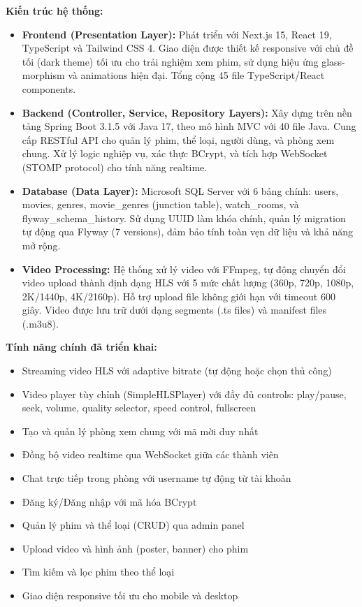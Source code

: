 \textbf{Kiến trúc hệ thống:}
\begin{itemize}
	\item \textbf{Frontend (Presentation Layer):} Phát triển với Next.js 15, React 19, TypeScript và Tailwind CSS 4. Giao diện được thiết kế responsive với chủ đề tối (dark theme) tối ưu cho trải nghiệm xem phim, sử dụng hiệu ứng glass-morphism và animations hiện đại. Tổng cộng 45 file TypeScript/React components.

	\item \textbf{Backend (Controller, Service, Repository Layers):} Xây dựng trên nền tảng Spring Boot 3.1.5 với Java 17, theo mô hình MVC với 40 file Java. Cung cấp RESTful API cho quản lý phim, thể loại, người dùng, và phòng xem chung. Xử lý logic nghiệp vụ, xác thực BCrypt, và tích hợp WebSocket (STOMP protocol) cho tính năng realtime.

	\item \textbf{Database (Data Layer):} Microsoft SQL Server với 6 bảng chính: users, movies, genres, movie\_genres (junction table), watch\_rooms, và flyway\_schema\_history. Sử dụng UUID làm khóa chính, quản lý migration tự động qua Flyway (7 versions), đảm bảo tính toàn vẹn dữ liệu và khả năng mở rộng.

	\item \textbf{Video Processing:} Hệ thống xử lý video với FFmpeg, tự động chuyển đổi video upload thành định dạng HLS với 5 mức chất lượng (360p, 720p, 1080p, 2K/1440p, 4K/2160p). Hỗ trợ upload file không giới hạn với timeout 600 giây. Video được lưu trữ dưới dạng segments (.ts files) và manifest files (.m3u8).
\end{itemize}

\textbf{Tính năng chính đã triển khai:}
\begin{itemize}
	\item Streaming video HLS với adaptive bitrate (tự động hoặc chọn thủ công)
	\item Video player tùy chỉnh (SimpleHLSPlayer) với đầy đủ controls: play/pause, seek, volume, quality selector, speed control, fullscreen
	\item Tạo và quản lý phòng xem chung với mã mời duy nhất
	\item Đồng bộ video realtime qua WebSocket giữa các thành viên
	\item Chat trực tiếp trong phòng với username tự động từ tài khoản
	\item Đăng ký/Đăng nhập với mã hóa BCrypt
	\item Quản lý phim và thể loại (CRUD) qua admin panel
	\item Upload video và hình ảnh (poster, banner) cho phim
	\item Tìm kiếm và lọc phim theo thể loại
	\item Giao diện responsive tối ưu cho mobile và desktop
\end{itemize}





